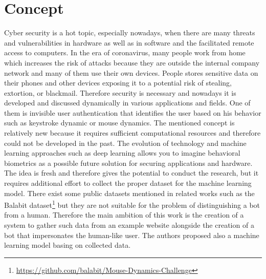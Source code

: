 \section{Concept}\label{sec:concept}
Cyber security is a hot topic, especially nowadays, when there are many threats and vulnerabilities in hardware as well as in software and the facilitated remote access to computers.
In the era of coronavirus, many people work from home which increases the risk of attacks because they are outside the internal company network and many of them use their own devices.
People stores sensitive data on their phones and other devices exposing it to a potential risk of stealing, extortion, or blackmail.
Therefore security is necessary and nowadays it is developed and discussed dynamically in various applications and fields.
One of them is invisible user authentication that identifies the user based on his behavior such as keystroke dynamic or mouse dynamics.
The mentioned concept is relatively new because it requires sufficient computational resources and therefore could not be developed in the past.
The evolution of technology and machine learning approaches such as deep learning allows you to imagine behavioral biometrics as a possible future solution for securing applications and hardware.
The idea is fresh and therefore gives the potential to conduct the research, but it requires additional effort to collect the proper dataset for the machine learning model.
There exist some public datasets mentioned in related works such as the Balabit dataset\footnote{\url{https://github.com/balabit/Mouse-Dynamics-Challenge}} but they are not suitable for the problem of distinguishing a bot from a human.
Therefore the main ambition of this work is the creation of a system to gather such data from an example website alongside the creation of a bot that impersonates the human-like user.
The authors proposed also a machine learning model basing on collected data.
